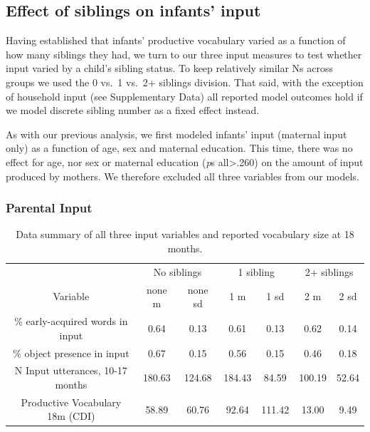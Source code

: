 \documentclass[
  english,
  man,floatsintext]{apa6}
\begin{document}
\hypertarget{effect-of-siblings-on-infants-input}{%
\subsection{Effect of siblings on infants' input}\label{effect-of-siblings-on-infants-input}}

Having established that infants' productive vocabulary varied as a function of how many siblings they had, we turn to our three input measures to test whether input varied by a child's sibling status. To keep relatively similar Ns across groups we used the 0 vs.~1 vs.~2+ siblings division. That said, with the exception of household input (see Supplementary Data) all reported model outcomes hold if we model discrete sibling number as a fixed effect instead.

As with our previous analysis, we first modeled infants' input (maternal input only) as a function of age, sex and maternal education. This time, there was no effect for age, nor sex or maternal education (\emph{p}s all\textgreater.260) on the amount of input produced by mothers. We therefore excluded all three variables from our models.

\hypertarget{parental-input}{%
\subsubsection{Parental Input}\label{parental-input}}

\begin{table}

\caption{\label{tab:table-data-summary}Data summary of all three input variables and reported vocabulary size at 18 months.}
\centering
\begin{tabular}[t]{ccccccc}
\toprule
\multicolumn{1}{c}{ } & \multicolumn{2}{c}{No siblings} & \multicolumn{2}{c}{1 sibling} & \multicolumn{2}{c}{2+ siblings} \\
\cmidrule(l{3pt}r{3pt}){2-3} \cmidrule(l{3pt}r{3pt}){4-5} \cmidrule(l{3pt}r{3pt}){6-7}
Variable & none m & none sd & 1 m & 1 sd & 2 m & 2 sd\\
\midrule
\% early-acquired words in input & 0.64 & 0.13 & 0.61 & 0.13 & 0.62 & 0.14\\
\% object presence in input & 0.67 & 0.15 & 0.56 & 0.15 & 0.46 & 0.18\\
N Input utterances, 10-17 months & 180.63 & 124.68 & 184.43 & 84.59 & 100.19 & 52.64\\
Productive Vocabulary 18m (CDI) & 58.89 & 60.76 & 92.64 & 111.42 & 13.00 & 9.49\\
\bottomrule
\end{tabular}
\end{table}
\end{document}
